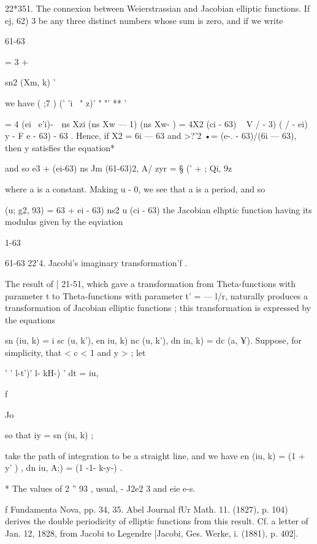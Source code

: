 22*351. The connexion between Weierstrassian and Jacobian elliptic functions. 
If ej, 62)  3 be any three distinct numbers whose sum is zero, and if we write 

61-63 



  =  3 + 



sn2 (Xm, k) ' 



we have ( ;7 )    (' 'i ~"  z)' " "'  **    '     

= 4 (ei ~e'i)-\ \   ns Xzi (ns Xw — 1) (ns Xw- ) 
= 4X2 (ci - 63) ~ V / -  3) ( / - ei)  y - F  e  - 63) - 63 . 
Hence, if X2 = 6i — 63 and >?'2 •= (e-. - 63)/(6i — 63), then y satisfies the equation* 

and so e3 + (ei-63) ns  Jm (61-63)2, A/ zyr = §  ('  +  ; Qi, 9z\ 

where a is a constant. Making u -  0, we see that a is a period, and so 

  (u; g2, 93) = 63 +  ei - 63) ns2  u (ci - 63)%
the Jacobian elhptic function having its modulus given by the eqviation 

1-63 



61-63 
22'4. Jacobi's imaginary transformation'f . 

The result of | 21-51, which gave a transformation from Theta-functions 
with parameter t to Theta-functions with parameter t' = — l/r, naturally 
produces a transformation of Jacobian elliptic functions ; this transformation 
is expressed by the equations 

sn (iu, k) = i sc (u, k'), en  iu, k)   nc (u, k'), dn  in, k) = dc (a, ¥). 
Suppose, for simplicity, that < c < 1 and y > ; let 

' '  l-t')'  l- kH-) '  dt = iu, 



f 

Jo 



so that iy = sn (iu, k) ; 

take the path of integration to be a straight line, and we have 
en (iu, k) = (1 + y' ) , dn  iu, A;) = (1 -1- k-y-) . 

* The values of  2  ''  93   ,   usual, - J2e2 3 and  eie e-s. 

f Fundamenta Nova, pp. 34, 35. Abel  Journal fUr Math. 11. (1827), p. 104) derives the 
double periodicity of elliptic functions from this result. Cf. a letter of Jan. 12, 1828, from Jacobi 
to Legendre [Jacobi, Ges. Werke, i. (1881), p. 402]. 



